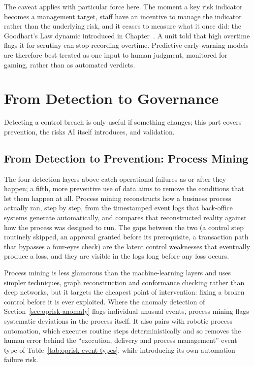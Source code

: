 \documentclass[../ai_in_finance]{subfiles}
\begin{document}
The caveat applies with particular force here. The moment a key risk indicator becomes a management target, staff have an incentive to manage the indicator rather than the underlying risk, and it ceases to measure what it once did: the Goodhart's Law dynamic introduced in Chapter~. A unit told that high overtime flags it for scrutiny can stop recording overtime. Predictive early-warning models are therefore best treated as one input to human judgment, monitored for gaming, rather than as automated verdicts.

\section{From Detection to Governance}

Detecting a control breach is only useful if something changes; this part covers prevention, the risks AI itself introduces, and validation.

\subsection{From Detection to Prevention: Process Mining}
\label{sec:oprisk-process-mining}

The four detection layers above catch operational failures as or after they happen; a fifth, more preventive use of data aims to remove the conditions that let them happen at all. Process mining reconstructs how a business process actually ran, step by step, from the timestamped event logs that back-office systems generate automatically, and compares that reconstructed reality against how the process was designed to run. The gaps between the two (a control step routinely skipped, an approval granted before its prerequisite, a transaction path that bypasses a four-eyes check) are the latent control weaknesses that eventually produce a loss, and they are visible in the logs long before any loss occurs.

Process mining is less glamorous than the machine-learning layers and uses simpler techniques, graph reconstruction and conformance checking rather than deep networks, but it targets the cheapest point of intervention: fixing a broken control before it is ever exploited. Where the anomaly detection of Section~\ref{sec:oprisk-anomaly} flags individual unusual events, process mining flags systematic deviations in the process itself. It also pairs with robotic process automation, which executes routine steps deterministically and so removes the human error behind the ``execution, delivery and process management'' event type of Table~\ref{tab:oprisk-event-types}, while introducing its own automation-failure risk.
\end{document}
